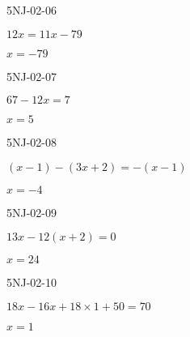 \begin{defproblem}{5NJ-02-06}%
\begin{onlyproblem}%
$12 x=11 x-79$

\end{onlyproblem}%
\begin{onlysolution}%
$x=-79$

\end{onlysolution}%
\end{defproblem}




\begin{defproblem}{5NJ-02-07}%
\begin{onlyproblem}%
$67-12 x=7$

\end{onlyproblem}%
\begin{onlysolution}%
$x=5$

\end{onlysolution}%
\end{defproblem}






\begin{defproblem}{5NJ-02-08}%
\begin{onlyproblem}%
$(x-1)-(3 x+2)=-(x-1)$

\end{onlyproblem}%
\begin{onlysolution}%
$x=-4$

\end{onlysolution}%
\end{defproblem}




\begin{defproblem}{5NJ-02-09}%
\begin{onlyproblem}%
$13 x-12(x+2)=0$

\end{onlyproblem}%
\begin{onlysolution}%
$x=24$

\end{onlysolution}%
\end{defproblem}




\begin{defproblem}{5NJ-02-10}%
\begin{onlyproblem}%
$18 x-16 x+18 \times 1+50=70$

\end{onlyproblem}%
\begin{onlysolution}%
$x=1$

\end{onlysolution}%
\end{defproblem}



